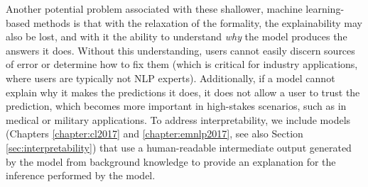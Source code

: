 Another potential problem associated with these shallower, machine learning-based methods is that with the relaxation of the formality, the explainability may also be lost, and with it the ability to understand \emph{why} the model produces the answers it does.  
Without this understanding, users cannot easily discern sources of error or determine how to fix them (which is critical for industry applications, where users are typically not NLP experts).  Additionally, if a model cannot explain why it makes the predictions it does, it does not allow a user to trust the prediction, which becomes more important in high-stakes scenarios, such as in medical or military applications. 
To address interpretability, we include models (Chapters \ref{chapter:cl2017} and \ref{chapter:emnlp2017}, see also Section \ref{sec:interpretability}) that use a human-readable intermediate output generated by the model from background knowledge to provide an explanation for the inference performed by the model.  




